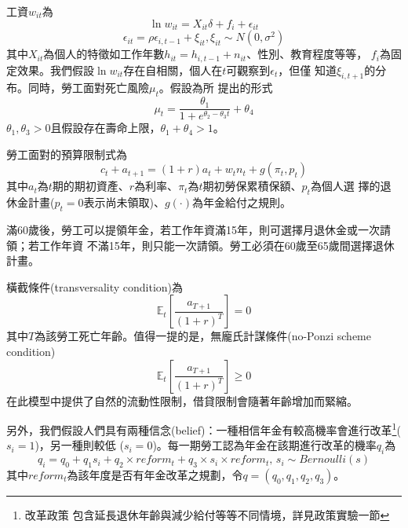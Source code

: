 \documentclass[12pt]{article}
\begin{document}
\begin{CJK*}{UTF8}{bkai}
工資$w_{it}$為
\begin{equation}
    \ln w_{it} = X_{it}\delta + f_i + \epsilon_{it}
\end{equation}
\begin{equation}
    \epsilon_{it} = \rho \epsilon_{i,t-1} + \xi_{it}, \xi_{it} \sim N(0,\sigma^2)
\end{equation}
其中$X_{it}$為個人的特徵如工作年數$h_{it}=h_{i,t-1} + n_{it}$、性別、教育程度等等，
$f_i$為固定效果。我們假設$\ln w_{it}$存在自相關，個人在$t$可觀察到$\epsilon_t$，但僅
知道$\xi_{i,t+1}$的分布。同時，勞工面對死亡風險$\mu_t$。假設為\cite{thatcher1999}所
提出的形式
\begin{equation}
    \mu_t = \frac{\theta_1}{1+ e^{\theta_2 - \theta_3 t}} + \theta_4
\end{equation}
$\theta_1,\theta_3 > 0$且假設存在壽命上限，$\theta_1+\theta_4 > 1$。

勞工面對的預算限制式為
\begin{equation}
    c_t + a_{t+1} = (1+r)a_t + w_t n_t + g(\pi_t,p_t)
\end{equation}
其中$a_t$為$t$期的期初資產、$r$為利率、$\pi_t$為$t$期初勞保累積保額、$p_t$為個人選
擇的退休金計畫($p_t=0$表示尚未領取)、$g(\cdot)$為年金給付之規則。

滿60歲後，勞工可以提領年金，若工作年資滿15年，則可選擇月退休金或一次請領；若工作年資
不滿15年，則只能一次請領。勞工必須在60歲至65歲間選擇退休計畫。

橫截條件(transversality condition)為
\begin{equation}
    \mathbb{E}_t[\frac{a_{T+1}}{(1+r)^T}] = 0
\end{equation}
其中$T$為該勞工死亡年齡。值得一提的是，無龐氏計謀條件(no-Ponzi scheme condition)
\begin{equation}
    \mathbb{E}_t[\frac{a_{T+1}}{(1+r)^T}] \geq 0
\end{equation}
在此模型中提供了自然的流動性限制，借貸限制會隨著年齡增加而緊縮。

另外，我們假設人們具有兩種信念(belief)：一種相信年金有較高機率會進行改革\footnote{改革政策
包含延長退休年齡與減少給付等等不同情境，詳見政策實驗一節}($s_i=1$)，另一種則較低
($s_i=0$)。每一期勞工認為年金在該期進行改革的機率$q_i$為
\begin{equation}
    q_i = q_0 + q_1 s_i + q_2\times reform_t + q_3\times s_i\times reform_t \text{, } s_i \sim Bernoulli(s)
\end{equation}
其中$reform_t$為該年度是否有年金改革之規劃，令$q=(q_0, q_1, q_2, q_3)$。


\end{CJK*}
\end{document}
